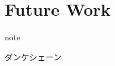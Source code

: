 \documentclass[xcolor=pdftex,dvipsnames,table]{beamer}
\begin{document}
\section*{Future Work}

\begin{frame}

    \vspace{\fill}
\begin{beamercolorbox}[center,shadow=true,rounded=true]{note} 
  \huge \begin{CJK}{UTF8}{min}ダンケシェーン\end{CJK}
\end{beamercolorbox}

    \vspace{\fill}
\end{frame} 
%
\end{document}
